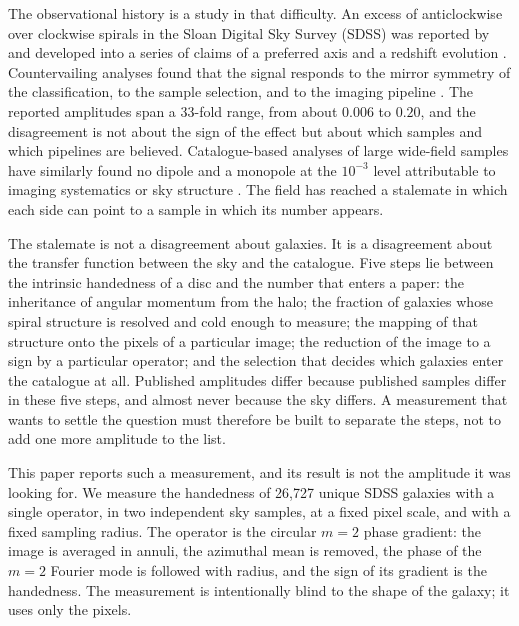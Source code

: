 \documentclass[11pt]{article}
\begin{document}
The observational history is a study in that difficulty. An excess of anticlockwise over clockwise
spirals in the Sloan Digital Sky Survey (SDSS) was reported by \citet{longo2011} and
developed into a series of claims of a preferred axis and a redshift evolution
\cite{shamir2012, shamir2017, shamir2024}. Countervailing analyses found that the signal responds
to the mirror symmetry of the classification, to the sample selection, and to the imaging pipeline
\cite{land2008, hayes2017, iye2020}. The reported amplitudes span a 33-fold range, from
about $0.006$ to $0.20$, and the disagreement is not about the sign of the effect but about which
samples and which pipelines are believed. Catalogue-based analyses of large wide-field samples have
similarly found no dipole and a monopole at the $10^{-3}$ level attributable to imaging systematics
or sky structure \cite{desi2026}. The field has reached a stalemate in which each side can point to a sample in
which its number appears.

The stalemate is not a disagreement about galaxies. It is a disagreement about the transfer
function between the sky and the catalogue. Five steps lie between the intrinsic handedness of a
disc and the number that enters a paper: the inheritance of angular momentum from the halo; the
fraction of galaxies whose spiral structure is resolved and cold enough to measure; the mapping of
that structure onto the pixels of a particular image; the reduction of the image to a sign by a
particular operator; and the selection that decides which galaxies enter the catalogue at all.
Published amplitudes differ because published samples differ in these five steps, and almost never
because the sky differs. A measurement that wants to settle the question must therefore be built
to separate the steps, not to add one more amplitude to the list.

This paper reports such a measurement, and its result is not the amplitude it was looking for. We
measure the handedness of 26,727 unique SDSS galaxies with a single operator, in two independent
sky samples, at a fixed pixel scale, and with a fixed sampling radius. The operator is the
circular $m=2$ phase gradient: the image is averaged in annuli, the azimuthal mean is removed, the
phase of the $m=2$ Fourier mode is followed with radius, and the sign of its gradient is the
handedness. The measurement is intentionally blind to the shape of the galaxy; it uses only the
pixels.
\end{document}
